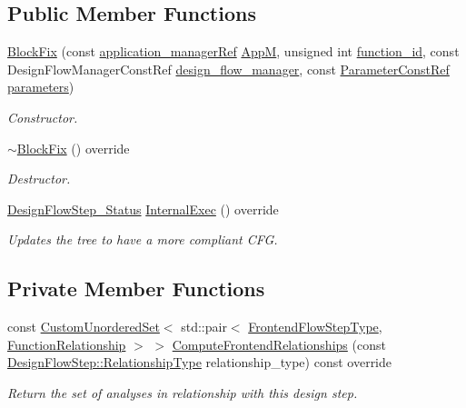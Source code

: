 \subsection*{Public Member Functions}
\begin{DoxyCompactItemize}
\item 
\hyperlink{classBlockFix_a14c8bc0af2765839a0435791817aa8b0}{Block\+Fix} (const \hyperlink{application__manager_8hpp_a04ccad4e5ee401e8934306672082c180}{application\+\_\+manager\+Ref} \hyperlink{classFrontendFlowStep_a0ac0d8db2a378416583f51c4faa59d15}{AppM}, unsigned int \hyperlink{classFunctionFrontendFlowStep_a58ef2383ad1a212a8d3f396625a4b616}{function\+\_\+id}, const Design\+Flow\+Manager\+Const\+Ref \hyperlink{classDesignFlowStep_ab770677ddf087613add30024e16a5554}{design\+\_\+flow\+\_\+manager}, const \hyperlink{Parameter_8hpp_a37841774a6fcb479b597fdf8955eb4ea}{Parameter\+Const\+Ref} \hyperlink{classDesignFlowStep_a802eaafe8013df706370679d1a436949}{parameters})
\begin{DoxyCompactList}\small\item\em Constructor. \end{DoxyCompactList}\item 
\hyperlink{classBlockFix_a52b6f70d745c301ade9953e9b54ed426}{$\sim$\+Block\+Fix} () override
\begin{DoxyCompactList}\small\item\em Destructor. \end{DoxyCompactList}\item 
\hyperlink{design__flow__step_8hpp_afb1f0d73069c26076b8d31dbc8ebecdf}{Design\+Flow\+Step\+\_\+\+Status} \hyperlink{classBlockFix_aa2b241ca4f66e4eeb51e051fdd464772}{Internal\+Exec} () override
\begin{DoxyCompactList}\small\item\em Updates the tree to have a more compliant C\+FG. \end{DoxyCompactList}\end{DoxyCompactItemize}
\subsection*{Private Member Functions}
\begin{DoxyCompactItemize}
\item 
const \hyperlink{classCustomUnorderedSet}{Custom\+Unordered\+Set}$<$ std\+::pair$<$ \hyperlink{frontend__flow__step_8hpp_afeb3716c693d2b2e4ed3e6d04c3b63bb}{Frontend\+Flow\+Step\+Type}, \hyperlink{classFrontendFlowStep_af7cf30f2023e5b99e637dc2058289ab0}{Function\+Relationship} $>$ $>$ \hyperlink{classBlockFix_ab802313a53911e54b68f98498ddc3da5}{Compute\+Frontend\+Relationships} (const \hyperlink{classDesignFlowStep_a723a3baf19ff2ceb77bc13e099d0b1b7}{Design\+Flow\+Step\+::\+Relationship\+Type} relationship\+\_\+type) const override
\begin{DoxyCompactList}\small\item\em Return the set of analyses in relationship with this design step. \end{DoxyCompactList}\end{DoxyCompactItemize}
